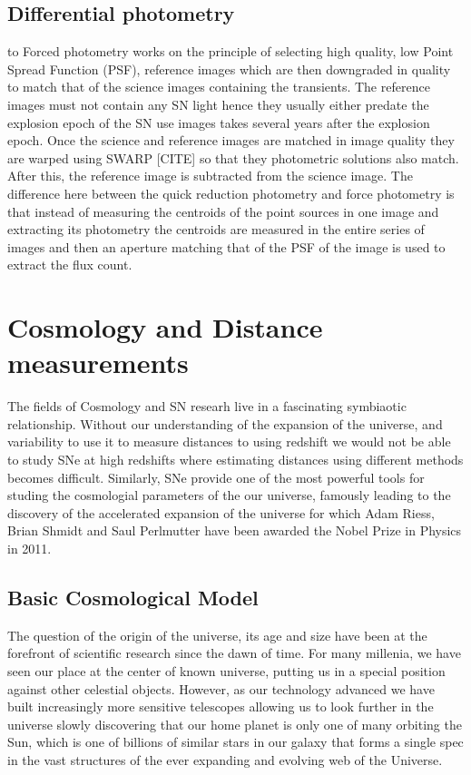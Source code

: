 \subsection{Differential photometry}
to Forced photometry works on the principle of selecting high quality, low Point Spread Function (PSF), reference images which are then downgraded in quality to match that of the science images containing the transients. The reference images must not contain any SN light hence they usually either predate the explosion epoch of the SN use images takes several years after the explosion epoch. Once the science and reference images are matched in image quality they are warped using SWARP [CITE] so that they photometric solutions also match. After this, the reference image is subtracted from the science image. The difference here between the quick reduction photometry and force photometry is that instead of measuring the centroids of the point sources in one image and extracting its photometry the centroids are measured in the entire series of images and then an aperture matching that of the PSF of the image is used to extract the flux count.

\section{Cosmology and Distance measurements}
The fields of Cosmology and SN researh live in a fascinating symbiaotic relationship. Without our understanding of the expansion of the universe, and variability to use it to measure distances to using redshift we would not be able to study SNe at high redshifts where estimating distances using different methods becomes difficult. Similarly, SNe provide one of the most powerful tools for studing the cosmologial parameters of the our universe, famously leading to the discovery of the accelerated expansion of the universe \citep{Riess1998,Perlmutter1997} for which Adam Riess, Brian Shmidt and Saul Perlmutter have been awarded the Nobel Prize in Physics in 2011.

\subsection{Basic Cosmological Model}
The question of the origin of the universe, its age and size have been at the forefront of scientific research since the dawn of time. For many millenia, we have seen our place at the center of known universe, putting us in a special position against other celestial objects. However, as our technology advanced we have built increasingly more sensitive telescopes allowing us to look further in the universe slowly discovering that our home planet is only one of many orbiting the Sun, which is one of billions of similar stars in our galaxy that forms a single spec in the vast structures of the ever expanding and evolving web of the Universe.

